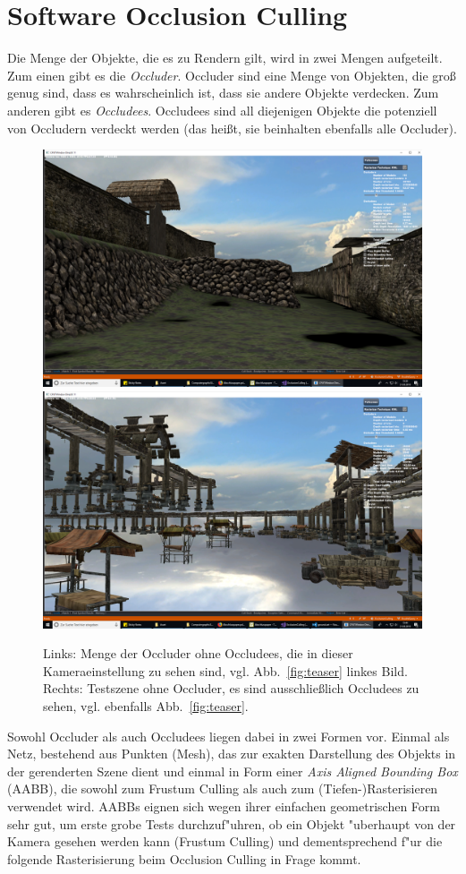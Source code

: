\documentclass[journal]{vgtc}
\begin{document}
\section{Software Occlusion Culling}
Die Menge der Objekte, die es zu Rendern gilt, wird in zwei Mengen aufgeteilt. Zum einen gibt es die \textit{Occluder}. Occluder sind eine Menge von Objekten, die gro{\ss} genug sind, dass es wahrscheinlich ist, dass sie andere Objekte verdecken. Zum anderen gibt es \textit{Occludees}. Occludees sind all diejenigen Objekte die potenziell von Occludern verdeckt werden (das hei{\ss}t, sie beinhalten ebenfalls alle Occluder).
\begin{figure}%
\includegraphics[width=0.5\columnwidth]{images/Occluder.png}%
\includegraphics[width=0.5\columnwidth]{images/Occludees.png}%
\caption{Links: Menge der Occluder ohne Occludees, die in dieser Kameraeinstellung zu sehen sind, vgl. Abb.\ \ref{fig:teaser} linkes Bild. Rechts: Testszene ohne Occluder, es sind ausschlie{\ss}lich Occludees zu sehen, vgl. ebenfalls Abb.\ \ref{fig:teaser}.}%
\label{fig:objects}%
\end{figure}
 Sowohl Occluder als auch Occludees liegen dabei in zwei Formen vor. Einmal als Netz, bestehend aus Punkten (Mesh), das zur exakten Darstellung des Objekts in der gerenderten Szene dient und einmal in Form einer \textit{Axis Aligned Bounding Box} (AABB), die sowohl zum Frustum Culling als auch zum (Tiefen-)Rasterisieren verwendet wird. AABBs eignen sich wegen ihrer einfachen geometrischen Form sehr gut, um erste grobe Tests durchzuf"uhren, ob ein Objekt "uberhaupt von der Kamera gesehen werden kann (Frustum Culling) und dementsprechend f"ur die folgende Rasterisierung beim Occlusion Culling in Frage kommt. 
\end{document}
